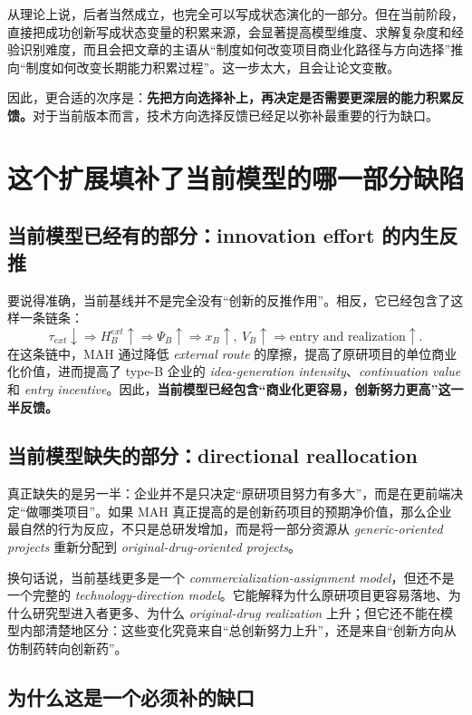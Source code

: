 \documentclass[12pt]{ctexart}
\begin{document}
从理论上说，后者当然成立，也完全可以写成状态演化的一部分。但在当前阶段，直接把成功创新写成状态变量的积累来源，会显著提高模型维度、求解复杂度和经验识别难度，而且会把文章的主语从“制度如何改变项目商业化路径与方向选择”推向“制度如何改变长期能力积累过程”。这一步太大，且会让论文变散。

因此，更合适的次序是：\textbf{先把方向选择补上，再决定是否需要更深层的能力积累反馈。}对于当前版本而言，技术方向选择反馈已经足以弥补最重要的行为缺口。

\section{这个扩展填补了当前模型的哪一部分缺陷}

\subsection{当前模型已经有的部分：innovation effort 的内生反推}

要说得准确，当前基线并不是完全没有“创新的反推作用”。相反，它已经包含了这样一条链条：
\[
\tau_{ext}\downarrow \Rightarrow H_B^{ext}\uparrow \Rightarrow \Psi_B\uparrow \Rightarrow x_B\uparrow,\ V_B\uparrow \Rightarrow \text{entry and realization}\uparrow .
\]
在这条链中，MAH 通过降低 \textit{external route} 的摩擦，提高了原研项目的单位商业化价值，进而提高了 type-B 企业的 \textit{idea-generation intensity}、\textit{continuation value} 和 \textit{entry incentive}。因此，\textbf{当前模型已经包含“商业化更容易，创新努力更高”这一半反馈。}

\subsection{当前模型缺失的部分：directional reallocation}

真正缺失的是另一半：企业并不是只决定“原研项目努力有多大”，而是在更前端决定“做哪类项目”。如果 MAH 真正提高的是创新药项目的预期净价值，那么企业最自然的行为反应，不只是总研发增加，而是将一部分资源从 \textit{generic-oriented projects} 重新分配到 \textit{original-drug-oriented projects}。

换句话说，当前基线更多是一个 \textit{commercialization-assignment model}，但还不是一个完整的 \textit{technology-direction model}。它能解释为什么原研项目更容易落地、为什么研究型进入者更多、为什么 \textit{original-drug realization} 上升；但它还不能在模型内部清楚地区分：这些变化究竟来自“总创新努力上升”，还是来自“创新方向从仿制药转向创新药”。

\subsection{为什么这是一个必须补的缺口}
\end{document}
